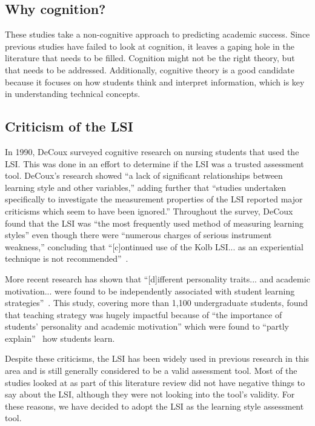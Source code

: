 \subsection{Why cognition?}
These studies take a non-cognitive approach to predicting academic success. Since previous studies have failed to look at cognition, it leaves a gaping hole in the literature that needs to be filled. Cognition might not be the right theory, but that needs to be addressed. Additionally, cognitive theory is a good candidate because it focuses on how students think and interpret information, which is key in understanding technical concepts.

\subsection{Criticism of the LSI}
In 1990, DeCoux surveyed cognitive research on nursing students that used the LSI. This was done in an effort to determine if the LSI was a trusted assessment tool. DeCoux's research showed ``a lack of significant relationships between learning style and other variables,'' adding further that ``studies undertaken specifically to investigate the measurement properties of the LSI reported major criticisms which seem to have been ignored.'' Throughout the survey, DeCoux found that the LSI was ``the most frequently used method of measuring learning styles'' even though there were ``numerous charges of serious instrument weakness,'' concluding that ``[c]ontinued use of the Kolb LSI... as an experiential technique is not recommended''~\citep{decoux2016}.

More recent research has shown that ``[d]ifferent personality traits... and academic motivation... were found to be independently associated with student learning strategies''~\citep{donche2013}. This study, covering more than 1,100 undergraduate students, found that teaching strategy was hugely impactful because of ``the importance of students' personality and academic motivation'' which were found to ``partly explain''~\citep{donche2013} how students learn.

Despite these criticisms, the LSI has been widely used in previous research in this area and is still generally considered to be a valid assessment tool. Most of the studies looked at as part of this literature review did not have negative things to say about the LSI, although they were not looking into the tool's validity. For these reasons, we have decided to adopt the LSI as the learning style assessment tool.

